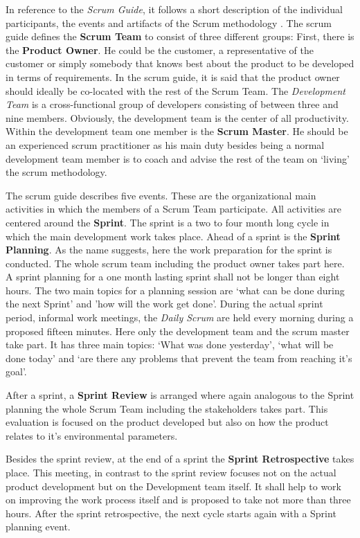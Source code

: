 \documentclass[a4paper,11pt,twoside]{article}
\begin{document}
In reference to the \textit{Scrum Guide}, it follows a short description of the individual participants, the events and artifacts of the Scrum methodology \cite{scrumguide}.
The scrum guide defines the \textbf{Scrum Team} to consist of three different groups: First, there is the \textbf{Product Owner}. He could be the customer, a representative of the customer or simply somebody that knows best about the product to be developed in terms of requirements. In the scrum guide, it is said that the product owner should ideally be co-located with the rest of the Scrum Team. The \textit{Development Team} is a cross-functional group of developers consisting of between three and nine members. Obviously, the development team is the center of all productivity. Within the development team one member is the \textbf{Scrum Master}. He should be an experienced scrum practitioner as his main duty besides being a normal development team member is to coach and advise the rest of the team on `living' the scrum methodology.

The scrum guide describes five events. These are the organizational main activities in which the members of a Scrum Team participate. All activities are centered around the \textbf{Sprint}. The sprint is a two to four month long cycle in which the main development work takes place. Ahead of a sprint is the \textbf{Sprint Planning}. As the name suggests, here the work preparation for the sprint is conducted. The whole scrum team including the product owner takes part here. A sprint planning for a one month lasting sprint shall not be longer than eight hours. The two main topics for a planning session are `what can be done during the next Sprint' and 'how will the work get done'.
During the actual sprint period, informal work meetings, the \textit{Daily Scrum} are held every morning during a proposed fifteen minutes. Here only the development team and the scrum master take part. It has three main topics: `What was done yesterday', `what will be done today' and `are there any problems that prevent the team from reaching it's goal'.

After a sprint, a \textbf{Sprint Review} is arranged where again analogous to the Sprint planning the whole Scrum Team including the stakeholders takes part. This evaluation is focused on the product developed but also on how the product relates to it's environmental parameters.

Besides the sprint review, at the end of a sprint the \textbf{Sprint Retrospective} takes place. This meeting, in contrast to the sprint review focuses not on the actual product development but on the Development team itself. It shall help to work on improving the work process itself and is proposed to take not more than three hours. After the sprint retrospective, the next cycle starts again with a Sprint planning event.
\end{document}
